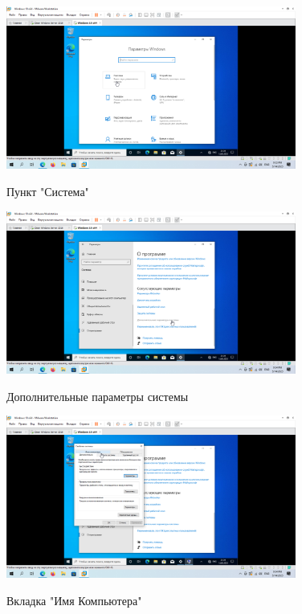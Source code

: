 \documentclass[a4paper]{article}
\begin{document}
  \begin{figure}[H]
    \centering
    \includegraphics[width=0.85\textwidth]{5_0071}
    \label{img:71}
    \caption{Пункт "Система"}
  \end{figure}

  \begin{figure}[H]
    \centering
    \includegraphics[width=0.85\textwidth]{5_0072}
    \label{img:72}
    \caption{Дополнительные параметры системы}
  \end{figure}

  \begin{figure}[H]
    \centering
    \includegraphics[width=0.85\textwidth]{5_0073}
    \label{img:73}
    \caption{Вкладка "Имя Компьютера"}
  \end{figure}
\end{document}
